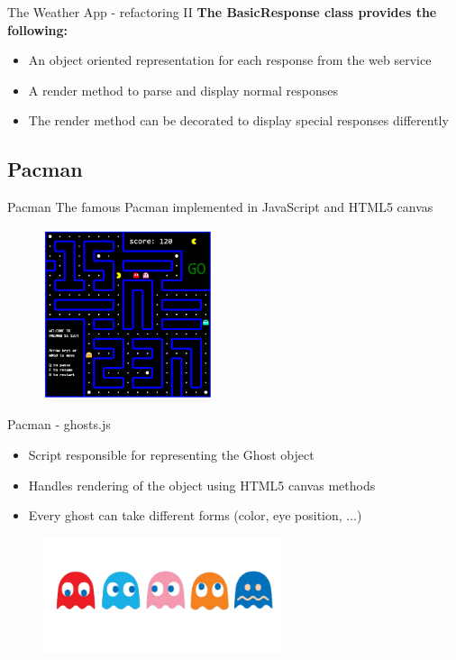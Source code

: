 \documentclass{beamer}
\begin{document}
\begin{frame}{The Weather App - refactoring II}
\textbf{The BasicResponse class provides the following:}
\begin{itemize}
    \item An object oriented representation for each response from the web service
    \item A render method to parse and display normal responses
    \item The render method can be decorated to display special responses differently 
\end{itemize}
\end{frame}



\subsection{Pacman}
\begin{frame}{Pacman\footnotemark}
The famous Pacman implemented in JavaScript and HTML5 canvas
    \begin{figure}[htp]
    \centering
    \includegraphics[width=5cm]{pics/pacman}
    \label{fig:pacman}
    \end{figure}
\end{frame}

\begin{frame}{Pacman - ghosts.js}
\begin{itemize}
\item Script responsible for representing the Ghost object
\item Handles rendering of the object using HTML5 canvas methods
\item Every ghost can take different forms (color, eye position, ...)
\end{itemize}

    \begin{figure}[htp]
    \centering
    \includegraphics[width=7cm]{pics/ghosts}
    \label{fig:ghosts}
    \end{figure}
\end{frame}
\end{document}
